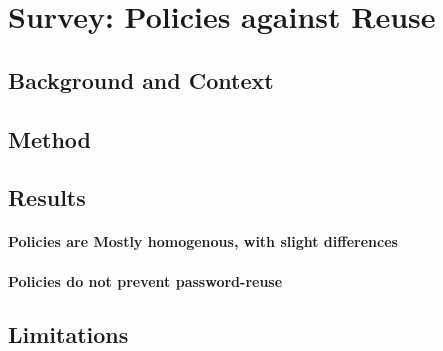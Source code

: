 \chapter[Survey: Policies against Reuse]{Survey: Policies against Reuse}\label{chap:policies-reuse}
\section{Background and Context}
\section{Method}

\section{Results}
\subsubsection{Policies are Mostly homogenous, with slight differences}
\subsubsection{Policies do not prevent password-reuse}

\section{Limitations}
